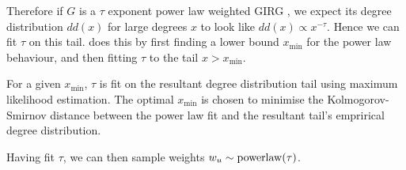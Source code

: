 




Therefore if $G$ is a $\tau$ exponent power law weighted GIRG , we expect its degree distribution $dd(x)$ for large degrees $x$ to look like $dd(x) \propto x^{-\tau}$. Hence we can fit $\tau$ on this tail. \PLP does this by first finding a lower bound $x_{\min}$ for the power law behaviour, and then fitting $\tau$ to the tail $x > x_{\min}$.


For a given $x_{\min}$, $\tau$ is fit on the resultant degree distribution tail using maximum likelihood estimation. The optimal $x_{\min}$ is chosen to minimise the Kolmogorov-Smirnov distance between the power law fit and the resultant tail's emprirical degree distribution.

Having fit $\tau$, we can then sample weights $w_u \sim \operatorname{powerlaw}(\tau)$.



